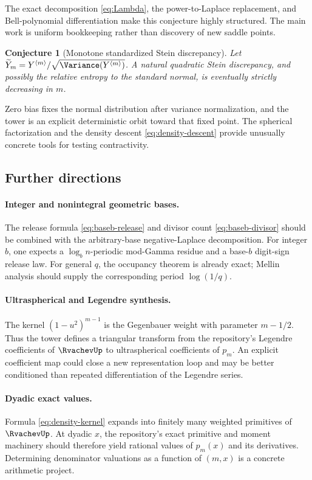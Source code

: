 \documentclass[11pt,oneside]{article}
\newtheorem{conjecture}[theorem]{Conjecture}
\theoremstyle{definition}
\theoremstyle{remark}
\newcommand{\Tower}[1]{Y^{\langle #1\rangle}}
\begin{document}
The exact decomposition \eqref{eq:Lambda}, the power-to-Laplace replacement,
and Bell-polynomial differentiation make this conjecture highly structured.
The main work is uniform bookkeeping rather than discovery of new saddle
points.

\begin{conjecture}[Monotone standardized Stein discrepancy]
\label{conj:Stein-monotone}
Let $\widetilde Y_m=\Tower{m}/\sqrt{\Variance(\Tower{m})}$.  A natural quadratic
Stein discrepancy, and possibly the relative entropy to the standard normal,
is eventually strictly decreasing in $m$.
\end{conjecture}

Zero bias fixes the normal distribution after variance normalization, and the
tower is an explicit deterministic orbit toward that fixed point.  The
spherical factorization and the density descent
\eqref{eq:density-descent} provide unusually concrete tools for testing
contractivity.

\subsection{Further directions}

\paragraph{Integer and nonintegral geometric bases.}
The release formula \eqref{eq:baseb-release} and divisor count
\eqref{eq:baseb-divisor} should be combined with the arbitrary-base
negative-Laplace decomposition.  For integer $b$, one expects a
$\log_b n$-periodic mod-Gamma residue and a base-$b$ digit-sign release law.
For general $q$, the occupancy theorem is already exact; Mellin analysis should
supply the corresponding period $\log(1/q)$.

\paragraph{Ultraspherical and Legendre synthesis.}
The kernel $(1-u^2)^{m-1}$ is the Gegenbauer weight with parameter
$m-1/2$.  Thus the tower defines a triangular transform from the repository's
Legendre coefficients of $\RvachevUp$ to ultraspherical coefficients of $p_m$.  An
explicit coefficient map could close a new representation loop and may be
better conditioned than repeated differentiation of the Legendre series.

\paragraph{Dyadic exact values.}
Formula \eqref{eq:density-kernel} expands into finitely many weighted
primitives of $\RvachevUp$.  At dyadic $x$, the repository's exact primitive and
moment machinery should therefore yield rational values of $p_m(x)$ and its
derivatives.  Determining denominator valuations as a function of $(m,x)$ is a
concrete arithmetic project.
\end{document}
